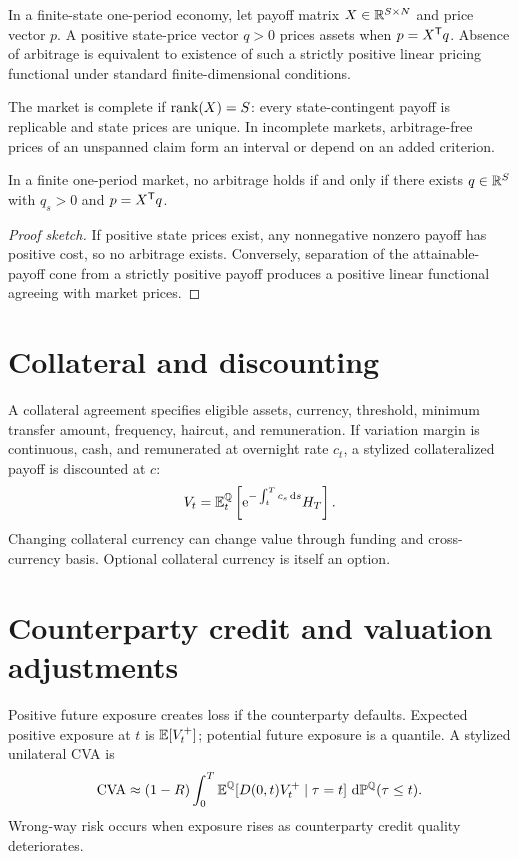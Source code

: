 In a finite-state one-period economy, let payoff matrix $X\in\mathbb R^{S\times N}$ and
price vector $p$. A positive state-price vector $q>0$ prices assets when
$p=X^\mathsf T q$. Absence of arbitrage is equivalent to existence of such a
strictly positive linear pricing functional under standard finite-dimensional
conditions.

The market is complete if $\operatorname{rank}(X)=S$: every state-contingent payoff is replicable
and state prices are unique. In incomplete markets, arbitrage-free prices of an
unspanned claim form an interval or depend on an added criterion.

\begin{theorem}
In a finite one-period market, no arbitrage holds if and only if there exists
$q\in\mathbb R^S$ with $q_s>0$ and $p=X^\mathsf T q$.
\end{theorem}
\begin{proof}[Proof sketch]
If positive state prices exist, any nonnegative nonzero payoff has positive cost, so
no arbitrage exists. Conversely, separation of the attainable-payoff cone from a
strictly positive payoff produces a positive linear functional agreeing with market
prices.
\end{proof}

\section{Collateral and discounting}

A collateral agreement specifies eligible assets, currency, threshold, minimum
transfer amount, frequency, haircut, and remuneration. If variation margin is
continuous, cash, and remunerated at overnight rate $c_t$, a stylized collateralized
payoff is discounted at $c$:
\[
V_t=\operatorname{\mathbb E}_t^\mathbb Q\left[
\mathrm e^{-\int_t^Tc_s\,\mathrm d s}H_T
\right].
\]
Changing collateral currency can change value through funding and cross-currency
basis. Optional collateral currency is itself an option.

\section{Counterparty credit and valuation adjustments}

Positive future exposure creates loss if the counterparty defaults. Expected
positive exposure at $t$ is $\operatorname{\mathbb E}[V_t^+]$; potential future exposure is a quantile.
A stylized unilateral CVA is
\[
\mathrm{CVA}\approx
(1-R)\int_0^T
\operatorname{\mathbb E}^\mathbb Q[D(0,t)V_t^+\mid\tau=t]\,\,\mathrm d\mathbb P^\mathbb Q(\tau\leq t).
\]
Wrong-way risk occurs when exposure rises as counterparty credit quality deteriorates.

